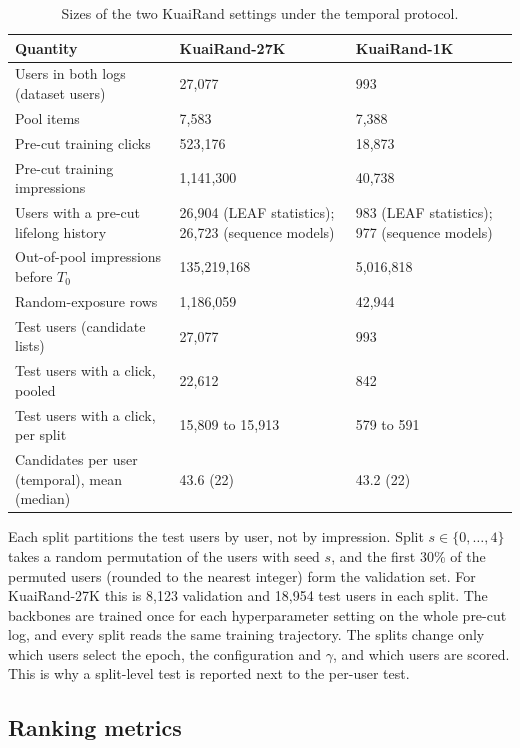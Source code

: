 \begin{table}[tbp]
\centering
\caption{Sizes of the two KuaiRand settings under the temporal protocol.}
\label{tab:data}
\footnotesize
\begin{tabular}{p{}p{}p{}}
\toprule
Quantity & KuaiRand-27K & KuaiRand-1K \\
\midrule
Users in both logs (dataset users) & 27,077 & 993 \\
Pool items & 7,583 & 7,388 \\
Pre-cut training clicks & 523,176 & 18,873 \\
Pre-cut training impressions & 1,141,300 & 40,738 \\
Users with a pre-cut lifelong history & 26,904 (LEAF statistics); 26,723 (sequence models) & 983 (LEAF statistics); 977 (sequence models) \\
Out-of-pool impressions before $T_0$ & 135,219,168 & 5,016,818 \\
Random-exposure rows & 1,186,059 & 42,944 \\
Test users (candidate lists) & 27,077 & 993 \\
Test users with a click, pooled & 22,612 & 842 \\
Test users with a click, per split & 15,809 to 15,913 & 579 to 591 \\
Candidates per user (temporal), mean (median) & 43.6 (22) & 43.2 (22) \\
\bottomrule
\end{tabular}
\end{table}

Each split partitions the test users by user, not by impression. Split $s\in\{0,\dots,4\}$ takes a random permutation of the users with seed
$s$, and the first 30\% of the permuted users (rounded to the nearest integer) form the validation set. For KuaiRand-27K this is 8,123
validation and 18,954 test users in each split. The backbones are trained once for each hyperparameter setting on the whole pre-cut log, and
every split reads the same training trajectory. The splits change only which users select the epoch, the configuration and $\gamma$, and which
users are scored. This is why a split-level test is reported next to the per-user test.

\subsection{Ranking metrics}
\label{sec:protocol-metrics}


